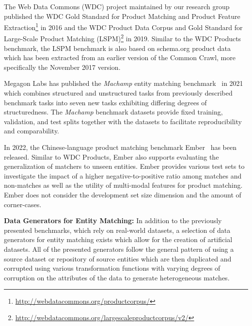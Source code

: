 \documentclass[sigconf,edbt]{acmart-edbt2024}
\begin{document}
The Web Data Commons (WDC) project maintained by our research group published the WDC Gold Standard for Product Matching and Product Feature Extraction\footnote{\url{http://webdatacommons.org/productcorpus/}} in 2016 and the WDC Product Data Corpus and Gold Standard for Large-Scale Product Matching (LSPM)\footnote{\url{http://webdatacommons.org/largescaleproductcorpus/v2/}} in 2019. Similar to the WDC Products benchmark, the LSPM benchmark is also based on schema.org product data which has been extracted from an earlier version of the Common Crawl, more specifically the November 2017 version.

Megagon Labs has published the \textit{Machamp} entity matching benchmark~\cite{wangMachampGeneralizedEntity2021} in 2021 which combines structured and unstructured tasks from previously described benchmark tasks into seven new tasks exhibiting differing degrees of structuredness. The \textit{Machamp} benchmark datasets provide fixed training, validation, and test splits together with the datasets to facilitate reproducibility and comparability.

In 2022, the Chinese-language product matching benchmark Ember~\cite{wangBridgingGapReality2022a} has been released. Similar to WDC Products, Ember also supports evaluating the generalization of matchers to unseen entities. Ember provides various test sets to investigate the impact of a higher negative-to-positive ratio among matches and non-matches as well as the utility of multi-modal features for product matching. Ember does not consider the development set size dimension and the amount of corner-cases. 

\textbf{Data Generators for Entity Matching:} In addition to the previously presented benchmarks, which rely on real-world datasets, a selection of data generators for entity matching exists \cite{christenFlexibleExtensibleGeneration2013,ioannouGeneratingBenchmarkData2013,ferraraBenchmarkingMatchingApplications2011,savetaLANCEPiercingHeart2015,hildebrandtLargeScaleDataPollution2020,primpeliImpactCharacteristicsMultisource2022} which allow for the creation of artificial datasets. All of the presented generators follow the general pattern of using a source dataset or repository of source entities which are then duplicated and corrupted using various transformation functions with varying degrees of corruption on the attributes of the data to generate heterogeneous matches.
\end{document}
